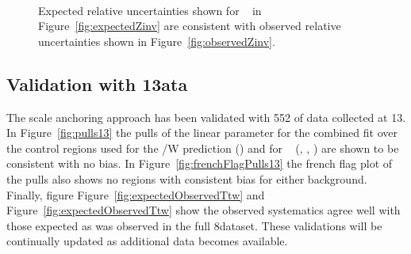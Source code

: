 \begin{figure}[h!]
  \centering
  ~~
  \\
  \caption{\label{fig:expectedObservedZinv}Expected relative uncertainties shown for \zInv~ in Figure~\ref{fig:expectedZinv} are consistent
  with observed relative uncertainties shown in Figure~\ref{fig:observedZinv}.}
\end{figure}

\subsection{Validation with 13\texorpdfstring{\TeV} data}
\label{sec:dataValid13TeV}
The scale anchoring approach has been validated with 552\ipb 
of data collected at 13\TeV. In Figure~\ref{fig:pulls13} the 
pulls of the linear parameter for the combined fit over
the control regions used for the \ttbar/W prediction (\mj)
and for \zInv~ (\mj, \mmj, \gj) are shown to be consistent with no bias.
In Figure~\ref{fig:frenchFlagPulls13} the french flag plot of the pulls
also shows no regions with consistent bias for either background.
Finally, figure Figure~\ref{fig:expectedObservedTtw} and Figure~\ref{fig:expectedObservedTtw}
show the observed systematics agree well with those expected as 
was observed in the full 8\TeV dataset. These validations will
be continually updated as additional data becomes available.

